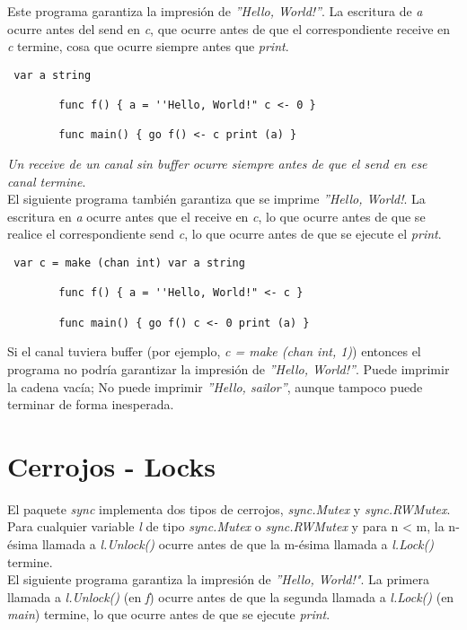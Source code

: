 	Este programa garantiza la impresión de \textit{''Hello, World!''}. La
	escritura de \textit{a} ocurre antes del send en \textit{c}, que ocurre
	antes de que el correspondiente receive en \textit{c} termine, cosa que
	ocurre siempre antes que \textit{print}.
	
	\begin{verbatim} var a string
	    
		func f() { a = ''Hello, World!" c <- 0 }
	    
		func main() { go f() <- c print (a) } \end{verbatim}
	
	\textit{Un receive de un canal sin buffer  ocurre siempre antes de que el
	send en ese canal termine}.\\
	
	El siguiente programa también garantiza que se imprime \textit{''Hello,
	World!}. La escritura en \textit{a} ocurre antes que el receive en
	\textit{c}, lo que ocurre antes de que se realice el correspondiente send
	\textit{c}, lo que ocurre antes de que se ejecute el \textit{print}.
	
	\begin{verbatim} var c = make (chan int) var a string
	    
		func f() { a = ''Hello, World!" <- c }
	    
		func main() { go f() c <- 0 print (a) } \end{verbatim}
	
	Si el canal tuviera buffer (por ejemplo, \textit{c = make (chan int, 1)})
	entonces el programa no podría garantizar la impresión de \textit{''Hello,
	World!''}. Puede imprimir la cadena vacía; No puede imprimir
	\textit{''Hello, sailor''}, aunque tampoco puede terminar de forma
	inesperada.

\section{Cerrojos - Locks}

El paquete \textit{sync} implementa dos tipos de cerrojos, \textit{sync.Mutex}
y \textit{sync.RWMutex}.\\

Para cualquier variable \textit{l} de tipo \textit{sync.Mutex}
o \textit{sync.RWMutex} y para n < m, la n-ésima llamada a \textit{l.Unlock()}
ocurre antes de que la m-ésima llamada a \textit{l.Lock()} termine.\\

El siguiente programa garantiza la impresión de \textit{''Hello, World!"}. La
primera llamada a \textit{l.Unlock()} (en \textit{f}) ocurre antes de que la
segunda llamada a \textit{l.Lock()} (en \textit{main}) termine, lo que ocurre
antes de que se ejecute \textit{print}.

